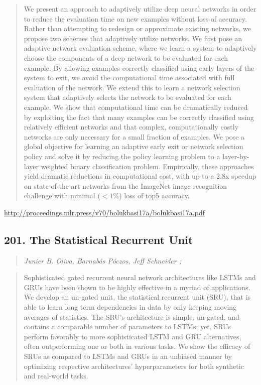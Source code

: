 \documentclass{article}
\begin{document}
\begin{quote}
    We present an approach to adaptively utilize deep neural networks in order to reduce the evaluation time on new examples without loss of accuracy. Rather than attempting to redesign or approximate existing networks, we propose two schemes that adaptively utilize networks. We first pose an adaptive network evaluation scheme, where we learn a system to adaptively choose the components of a deep network to be evaluated for each example. By allowing examples correctly classified using early layers of the system to exit, we avoid the computational time associated with full evaluation of the network. We extend this to learn a network selection system that adaptively selects the network to be evaluated for each example. We show that computational time can be dramatically reduced by exploiting the fact that many examples can be correctly classified using relatively efficient networks and that complex, computationally costly networks are only necessary for a small fraction of examples. We pose a global objective for learning an adaptive early exit or network selection policy and solve it by reducing the policy learning problem to a layer-by-layer weighted binary classification problem. Empirically, these approaches yield dramatic reductions in computational cost, with up to a 2.8x speedup on state-of-the-art networks from the ImageNet image recognition challenge with minimal ($<1\%$) loss of top5 accuracy.  
\end{quote}

\href{http://proceedings.mlr.press/v70/bolukbasi17a/bolukbasi17a.pdf}{http://proceedings.mlr.press/v70/bolukbasi17a/bolukbasi17a.pdf}

\subsection{201. The Statistical Recurrent Unit}

\begin{quote}
\footnotesize{\textit{Junier B. Oliva, Barnabás Póczos, Jeff Schneider ;}}

\end{quote}

\begin{quote}
    Sophisticated gated recurrent neural network architectures like LSTMs and GRUs have been shown to be highly effective in a myriad of applications. We develop an un-gated unit, the statistical recurrent unit (SRU), that is able to learn long term dependencies in data by only keeping moving averages of statistics. The SRU’s architecture is simple, un-gated, and contains a comparable number of parameters to LSTMs; yet, SRUs perform favorably to more sophisticated LSTM and GRU alternatives, often outperforming one or both in various tasks. We show the efficacy of SRUs as compared to LSTMs and GRUs in an unbiased manner by optimizing respective architectures’ hyperparameters for both synthetic and real-world tasks.  
\end{quote}
\end{document}
